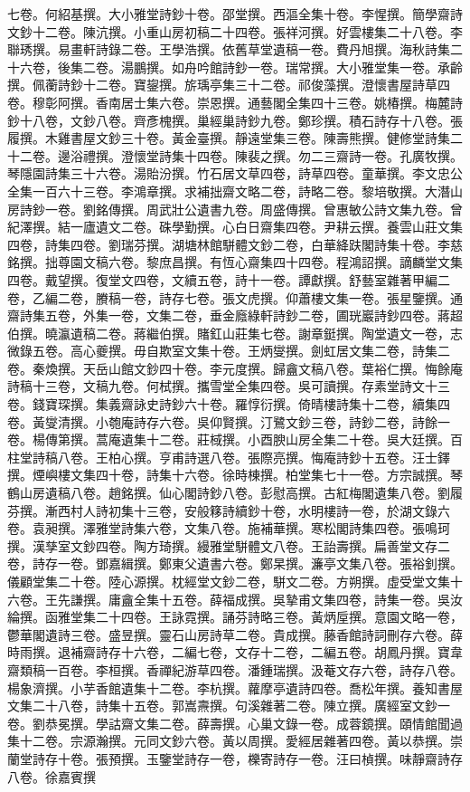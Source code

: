 \begin{pinyinscope}
七卷。何紹基撰。大小雅堂詩鈔十卷。邵堂撰。西漚全集十卷。李惺撰。簡學齋詩文鈔十二卷。陳沆撰。小重山房初稿二十四卷。張祥河撰。好雲樓集二十八卷。李聯琇撰。易畫軒詩錄二卷。王學浩撰。依舊草堂遺稿一卷。費丹旭撰。海秋詩集二十六卷，後集二卷。湯鵬撰。如舟吟館詩鈔一卷。瑞常撰。大小雅堂集一卷。承齡撰。佩蘅詩鈔十二卷。寶鋆撰。旂瑀亭集三十二卷。祁俊藻撰。澄懷書屋詩草四卷。穆彰阿撰。香南居士集六卷。崇恩撰。通藝閣全集四十三卷。姚椿撰。梅麓詩鈔十八卷，文鈔八卷。齊彥槐撰。巢經巢詩鈔九卷。鄭珍撰。積石詩存十八卷。張履撰。木雞書屋文鈔三十卷。黃金臺撰。靜遠堂集三卷。陳壽熊撰。健修堂詩集二十二卷。邊浴禮撰。澄懷堂詩集十四卷。陳裴之撰。勿二三齋詩一卷。孔廣牧撰。琴隱園詩集三十六卷。湯貽汾撰。竹石居文草四卷，詩草四卷。童華撰。李文忠公全集一百六十三卷。李鴻章撰。求補拙齋文略二卷，詩略二卷。黎培敬撰。大潛山房詩鈔一卷。劉銘傳撰。周武壯公遺書九卷。周盛傳撰。曾惠敏公詩文集九卷。曾紀澤撰。結一廬遺文二卷。硃學勤撰。心白日齋集四卷。尹耕云撰。養雲山莊文集四卷，詩集四卷。劉瑞芬撰。湖塘林館駢體文鈔二卷，白華絳趺閣詩集十卷。李慈銘撰。拙尊園文稿六卷。黎庶昌撰。有恆心齋集四十四卷。程鴻詔撰。謫麟堂文集四卷。戴望撰。復堂文四卷，文續五卷，詩十一卷。譚獻撰。舒藝室雜著甲編二卷，乙編二卷，賸稿一卷，詩存七卷。張文虎撰。仰蕭樓文集一卷。張星鑒撰。通齋詩集五卷，外集一卷，文集二卷，垂金廕綠軒詩鈔二卷，圃珖巖詩鈔四卷。蔣超伯撰。曉瀛遺稿二卷。蔣繼伯撰。賭釭山莊集七卷。謝章鋌撰。陶堂遺文一卷，志微錄五卷。高心夔撰。毋自欺室文集十卷。王炳燮撰。劍虹居文集二卷，詩集二卷。秦煥撰。天岳山館文鈔四十卷。李元度撰。歸盦文稿八卷。葉裕仁撰。悔餘庵詩稿十三卷，文稿九卷。何栻撰。攜雪堂全集四卷。吳可讀撰。存素堂詩文十三卷。錢寶琛撰。集義齋詠史詩鈔六十卷。羅惇衍撰。倚晴樓詩集十二卷，續集四卷。黃燮清撰。小匏庵詩存六卷。吳仰賢撰。汀鷺文鈔三卷，詩鈔二卷，詩餘一卷。楊傳第撰。蒿庵遺集十二卷。莊棫撰。小酉腴山房全集二十卷。吳大廷撰。百柱堂詩稿八卷。王柏心撰。亨甫詩選八卷。張際亮撰。悔庵詩鈔十五卷。汪士鐸撰。煙嶼樓文集四十卷，詩集十六卷。徐時棟撰。柏堂集七十一卷。方宗誠撰。琴鶴山房遺稿八卷。趙銘撰。仙心閣詩鈔八卷。彭慰高撰。古紅梅閣遺集八卷。劉履芬撰。漸西村人詩初集十三卷，安般簃詩續鈔十卷，水明樓詩一卷，於湖文錄六卷。袁昶撰。澤雅堂詩集六卷，文集八卷。施補華撰。寒松閣詩集四卷。張鳴珂撰。漢孳室文鈔四卷。陶方琦撰。縵雅堂駢體文八卷。王詒壽撰。扁善堂文存二卷，詩存一卷。鄧嘉緝撰。鄭東父遺書六卷。鄭杲撰。濂亭文集八卷。張裕釗撰。儀顧堂集二十卷。陸心源撰。枕經堂文鈔二卷，駢文二卷。方朔撰。虛受堂文集十六卷。王先謙撰。庸盦全集十五卷。薛福成撰。吳摯甫文集四卷，詩集一卷。吳汝綸撰。函雅堂集二十四卷。王詠霓撰。誦芬詩略三卷。黃炳垕撰。意園文略一卷，鬱華閣遺詩三卷。盛昱撰。靈石山房詩草二卷。貴成撰。藤香館詩詞刪存六卷。薛時雨撰。退補齋詩存十六卷，二編七卷，文存十二卷，二編五卷。胡鳳丹撰。寶韋齋類稿一百卷。李桓撰。香禪紀游草四卷。潘鍾瑞撰。汲菴文存六卷，詩存八卷。楊象濟撰。小芋香館遺集十二卷。李杭撰。蘿摩亭遺詩四卷。喬松年撰。養知書屋文集二十八卷，詩集十五卷。郭嵩燾撰。句溪雜著二卷。陳立撰。廣經室文鈔一卷。劉恭冕撰。學詁齋文集二卷。薛壽撰。心巢文錄一卷。成蓉鏡撰。頤情館聞過集十二卷。宗源瀚撰。元同文鈔六卷。黃以周撰。愛經居雜著四卷。黃以恭撰。崇蘭堂詩存十卷。張預撰。玉鑒堂詩存一卷，櫟寄詩存一卷。汪曰楨撰。味靜齋詩存八卷。徐嘉賓撰
\end{pinyinscope}
